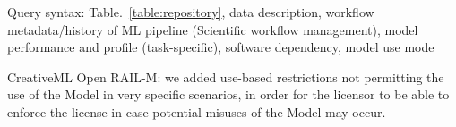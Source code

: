Query syntax: Table.~\ref{table:repository}, data description, workflow metadata/history of ML pipeline (Scientific workflow management), model performance and profile (task-specific), software dependency,
model use mode

CreativeML Open RAIL-M:
we added use-based restrictions not permitting the use of the Model in very specific scenarios, in order for the licensor to be able to enforce the license in case potential misuses of the Model may occur.
